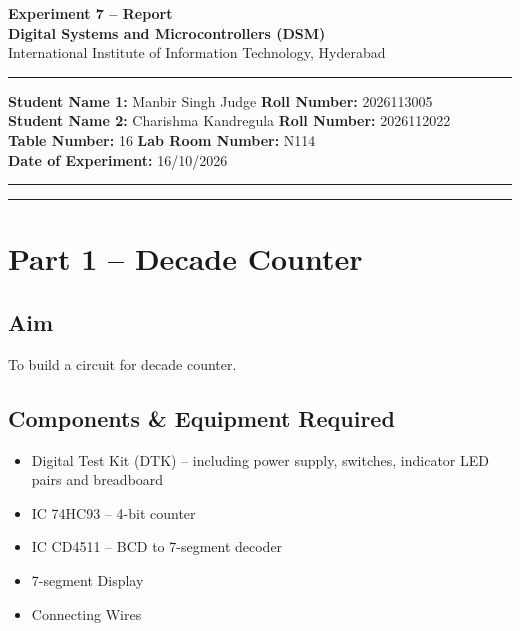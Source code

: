 \documentclass[11pt, a4paper]{article}
\begin{document}
\thispagestyle{no_hdr_border_rule}

\begin{center}
    {\Large \textbf{Experiment 7 -- Report}} \\[0.2cm]
    {\large \textbf{Digital Systems and Microcontrollers (DSM)}} \\[0.1cm]
    {\normalsize International Institute of Information Technology, Hyderabad} \\[0.3cm]
\end{center}

\vspace{0.2cm}
\hrule
\vspace{0.4cm}

\noindent \textbf{Student Name 1:} Manbir Singh Judge \hfill \textbf{Roll Number:} 2026113005 \\
\noindent \textbf{Student Name 2:} Charishma Kandregula \hfill \textbf{Roll Number:} 2026112022 \\
\noindent \textbf{Table Number:} 16 \hfill \textbf{Lab Room Number:} N114 \\
\noindent \textbf{Date of Experiment:} 16/10/2026

\vspace{0.4cm}
\hrule
\vspace{0.5cm}

\vspace{1em}

\tableofcontents
\vspace{0.5cm}
\hrule
\vspace{0.8cm}

\newpage
{}

\section{Part 1 -- Decade Counter}

\subsection{Aim}
To build a circuit for decade counter.

\subsection{Components \& Equipment Required}
\begin{itemize}
    \item Digital Test Kit (DTK) -- including power supply, switches, indicator LED pairs and breadboard
    \item IC 74HC93 -- 4-bit counter
    \item IC CD4511 -- BCD to 7-segment decoder
    \item 7-segment Display
    \item Connecting Wires
\end{itemize}
\end{document}
